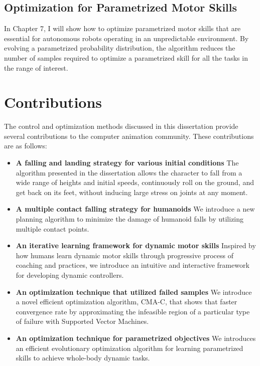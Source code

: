 \subsection{Optimization for Parametrized Motor Skills}
In Chapter 7, I will show how to optimize parametrized motor skills that are
essential for autonomous robots operating in an unpredictable environment. 
By evolving a parametrized probability distribution, the algorithm reduces 
the number of samples required to optimize a parametrized skill for 
all the tasks in the range of interest. 


\section{Contributions}
The control and optimization methods discussed in this dissertation provide
several contributions to the computer animation community. 
These contributions are as follows:


\begin{itemize}
\item \textbf{A falling and landing strategy for various initial conditions}
  The algorithm presented in the dissertation allows the character to fall from 
  a wide range of heights and initial speeds, continuously roll on the ground, 
  and get back on its feet, without inducing large stress on joints at any
  moment.
\item \textbf{A multiple contact falling strategy for humanoids}
  We introduce a new planning algorithm to minimize the damage of humanoid 
  falls by utilizing multiple contact points. 
\item \textbf{An iterative learning framework for dynamic motor skills}
  Inspired by how humans learn dynamic motor skills through progressive process 
  of coaching and practices, we introduce an intuitive and interactive 
  framework for developing dynamic controllers. 
\item \textbf{An optimization technique that utilized failed samples}
  We introduce a novel efficient optimization algorithm, CMA-C, that shows 
  that faster convergence rate by approximating the infeasible region of a  
  particular type of failure with Supported Vector Machines.
\item \textbf{An optimization technique for parametrized objectives}
  We introduces an efficient evolutionary optimization algorithm for learning
  parametrized skills to achieve whole-body dynamic tasks. 
\end{itemize}

